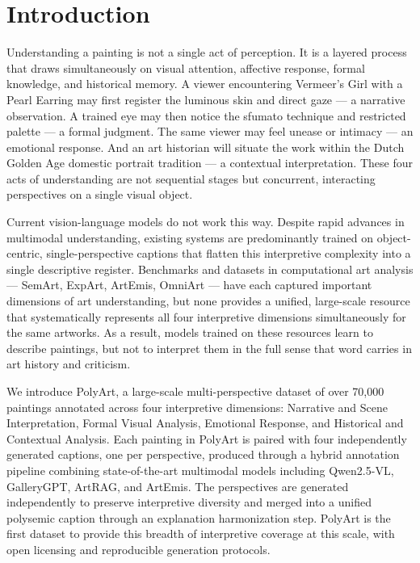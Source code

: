 \section{Introduction}
Understanding a painting is not a single act of perception. It is a layered process that draws simultaneously on visual attention, affective response, formal knowledge, and historical memory. A viewer encountering Vermeer's Girl with a Pearl Earring may first register the luminous skin and direct gaze — a narrative observation. A trained eye may then notice the sfumato technique and restricted palette — a formal judgment. The same viewer may feel unease or intimacy — an emotional response. And an art historian will situate the work within the Dutch Golden Age domestic portrait tradition — a contextual interpretation. These four acts of understanding are not sequential stages but concurrent, interacting perspectives on a single visual object.

Current vision-language models do not work this way. Despite rapid advances in multimodal understanding, existing systems are predominantly trained on object-centric, single-perspective captions that flatten this interpretive complexity into a single descriptive register. Benchmarks and datasets in computational art analysis — SemArt, ExpArt, ArtEmis, OmniArt — have each captured important dimensions of art understanding, but none provides a unified, large-scale resource that systematically represents all four interpretive dimensions simultaneously for the same artworks. As a result, models trained on these resources learn to describe paintings, but not to interpret them in the full sense that word carries in art history and criticism.

We introduce PolyArt, a large-scale multi-perspective dataset of over 70,000 paintings annotated across four interpretive dimensions: Narrative and Scene Interpretation, Formal Visual Analysis, Emotional Response, and Historical and Contextual Analysis. Each painting in PolyArt is paired with four independently generated captions, one per perspective, produced through a hybrid annotation pipeline combining state-of-the-art multimodal models including Qwen2.5-VL, GalleryGPT, ArtRAG, and ArtEmis. The perspectives are generated independently to preserve interpretive diversity and merged into a unified polysemic caption through an explanation harmonization step. PolyArt is the first dataset to provide this breadth of interpretive coverage at this scale, with open licensing and reproducible generation protocols.

